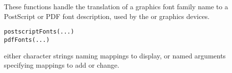%
\begin{Description}\relax
These functions handle the translation of a \R{} graphics
font family name to a PostScript or PDF font description, used by the
 or  graphics devices.
\end{Description}
%
\begin{Usage}
\begin{verbatim}
postscriptFonts(...)
pdfFonts(...)
\end{verbatim}
\end{Usage}
%
\begin{Arguments}
\begin{ldescription}
\item[\code{...}] either character strings naming mappings to display,
or named arguments specifying mappings to add or change.
\end{ldescription}
\end{Arguments}
%
